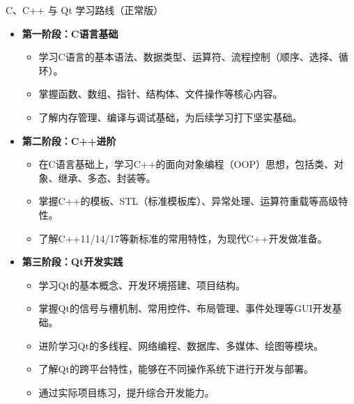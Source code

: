 \documentclass[UTF8,aspectratio=169]{beamer}
\begin{document}
\begin{frame}{C、C++ 与 Qt 学习路线（正常版）}
    \begin{itemize}
        \item \textbf{第一阶段：C语言基础}
        \begin{itemize}
            \item 学习C语言的基本语法、数据类型、运算符、流程控制（顺序、选择、循环）。
            \item 掌握函数、数组、指针、结构体、文件操作等核心内容。
            \item 了解内存管理、编译与调试基础，为后续学习打下坚实基础。
        \end{itemize}
        \item \textbf{第二阶段：C++进阶}
        \begin{itemize}
            \item 在C语言基础上，学习C++的面向对象编程（OOP）思想，包括类、对象、继承、多态、封装等。
            \item 掌握C++的模板、STL（标准模板库）、异常处理、运算符重载等高级特性。
            \item 了解C++11/14/17等新标准的常用特性，为现代C++开发做准备。
        \end{itemize}
        \item \textbf{第三阶段：Qt开发实践}
        \begin{itemize}
            \item 学习Qt的基本概念、开发环境搭建、项目结构。
            \item 掌握Qt的信号与槽机制、常用控件、布局管理、事件处理等GUI开发基础。
            \item 进阶学习Qt的多线程、网络编程、数据库、多媒体、绘图等模块。
            \item 了解Qt的跨平台特性，能够在不同操作系统下进行开发与部署。
            \item 通过实际项目练习，提升综合开发能力。
        \end{itemize}
    \end{itemize}
\end{frame}
\end{document}
